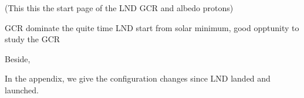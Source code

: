 (This this the start page of the LND GCR and albedo protons)


GCR dominate the quite time
LND start from solar minimum, good opptunity to study the GCR

Beside,

In the appendix, we give the configuration changes since LND landed and launched. 

